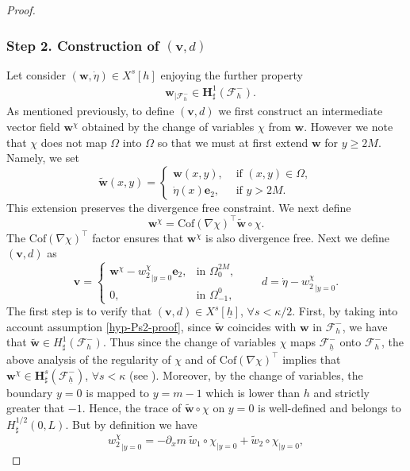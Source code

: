 \documentclass[10pt]{amsart}
\let\mathcal\mathscr
\theoremstyle{remark}
\theoremstyle{definition}
\newcommand{\vg}{\boldsymbol{v}}
\newcommand{\wg}{\boldsymbol{w}}
\newcommand{\BS}[1]{\boldsymbol{#1}}
\newcommand{\etap}{\dot{\eta}}
\newcommand{\hb}{{\underline{h}}}
\newcommand{\Cof}{\mathrm{Cof}}
\begin{document}
\begin{proof}
\subsubsection*{Step 2. Construction of $(\vg,d)$}
Let consider $(\wg,\etap) \in X^s[h]$ enjoying the further property
\begin{eqnarray}
&\wg_{\vert\mathcal{F}_{h}^{-}}\in \BS{H}^{1}_{\sharp}(\mathcal{F}^{-}_{h}).\label{hyp-Ps2-proof}
\end{eqnarray}
As mentioned previously, to define $(\vg,d)$ we first construct an intermediate vector field
$\wg^{\chi}$ obtained by the change of variables $\chi$ from $\wg$. However we note that
$\chi$ does not map $\Omega$ into $\Omega$ so that we must at first extend $\wg$ for
$y\geq 2 M$. Namely, we set
\[
\tilde{\wg}(x,y) =
\begin{cases}
\wg(x,y), & \text{ if $(x,y) \in \Omega$}, \\
\etap(x)\BS{e}_{2}, & \text{ if $y >2M$}.
\end{cases}
\]
This extension preserves the divergence free constraint.
We next define
\[\wg^\chi = \Cof(\nabla \chi)^{\top}\tilde{\wg}\circ \chi.\]
The $\Cof(\nabla \chi)^{\top}$ factor ensures that $\wg^\chi$ is also divergence free.
Next we define $(\vg,d)$ as
\begin{equation}\label{def.v.b}
\vg=\begin{cases}
\wg^\chi -{w_{2}^\chi}_{|{y=0}}\BS{e}_{2}, & \text{in } \Omega^{2M}_{0},\\
0, & \text{in }\Omega^{0}_{-1},
\end{cases}
\qquad
d=\etap -{w_{2}^\chi}_{|{y=0}}.
\end{equation}
The first step is to verify that $(\vg, d) \in X^s[\hb]$, $\forall s<\kappa/2$. First, by taking into account assumption \eqref{hyp-Ps2-proof}, since $\tilde{\wg}$ coincides with $\wg$ in $\mathcal F_{h}^{-}$, we have that $\tilde{\wg}\in H_\sharp^1(\mathcal F_{h}^{-})$. Thus since the change of variables $\chi$ maps $\mathcal{F}^-_{\hb}$ onto $\mathcal{F}^-_{h}$, the above analysis of the regularity of $\chi$ and of $ \Cof(\nabla \chi)^{\top}$ implies that $\wg^\chi\in \BS{H}^s_\sharp(\mathcal{F}^-_{\hb})$, $\forall s<\kappa$ (see \cite[Prop.\,B.1]{Grubsolo} ). Moreover, by the change of variables, the boundary $y=0$ is mapped to $y= m-1 $ which is lower than $h$ and strictly greater that $-1$. Hence, the trace of $\tilde{\wg} \circ \chi$ on $y=0$ is well-defined and belongs to $ H^{1/2}_{\sharp}(0,L)$.
But by definition we have
\[
{w_{2}^\chi}_{|{y=0}} = -\partial_x m \ \tilde{w}_{1}\circ\chi_{|{y=0}}+\tilde{w}_{2}\circ\chi_{|{y=0}},
\]
\end{proof}
\end{document}
